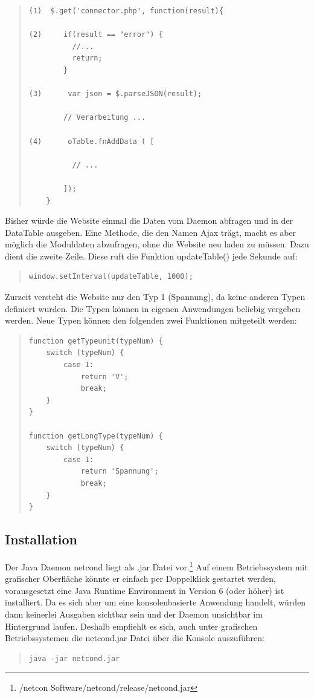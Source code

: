 \documentclass[a4paper,14pt,headsepline]{scrartcl}
\begin{document}
\begin{quote}
\begin{verbatim}
(1)  $.get('connector.php', function(result){

(2)     if(result == "error") { 
          //...
          return;
        }
    
(3)      var json = $.parseJSON(result);
    
        // Verarbeitung ...
    
(4)      oTable.fnAddData ( [
    
          // ... 
                
        ]);
    }
\end{verbatim}
\end{quote}  
Bisher würde die Website einmal die Daten vom Daemon abfragen und in der DataTable ausgeben. Eine Methode, die den Namen Ajax trägt, macht es aber möglich die Moduldaten abzufragen, ohne die Website neu laden zu müssen. Dazu dient die zweite Zeile. Diese ruft die Funktion updateTable() jede Sekunde auf:

\begin{quote}
\begin{verbatim}
window.setInterval(updateTable, 1000);
\end{verbatim}
\end{quote}  

Zurzeit versteht die Website nur den Typ 1 (Spannung), da keine anderen Typen definiert wurden. Die Typen können in eigenen Anwendungen beliebig vergeben werden. Neue Typen können den folgenden zwei Funktionen mitgeteilt werden: 

\begin{quote}
\begin{verbatim}
function getTypeunit(typeNum) {
    switch (typeNum) {
        case 1:
            return 'V';
            break;
    }
}

function getLongType(typeNum) {
    switch (typeNum) {
        case 1:
            return 'Spannung';
            break;
    }
}
\end{verbatim}
\end{quote}  
 
\newpage

\subsection{Installation}

Der Java Daemon netcond liegt als .jar Datei vor.\footnote{/netcon Software/netcond/release/netcond.jar} Auf einem Betriebssystem mit grafischer Oberfläche könnte er einfach per Doppelklick gestartet werden, vorausgesetzt eine Java Runtime Environment in Version 6 (oder höher) ist installiert. Da es sich aber um eine konsolenbasierte Anwendung handelt, würden dann keinerlei Ausgaben sichtbar sein und der Daemon unsichtbar im Hintergrund laufen. Deshalb empfiehlt es sich, auch unter grafischen Betriebssystemen die netcond.jar Datei über die Konsole auszuführen:
\begin{quote}
\begin{verbatim}
java -jar netcond.jar
\end{verbatim}
\end{quote}
\end{document}
